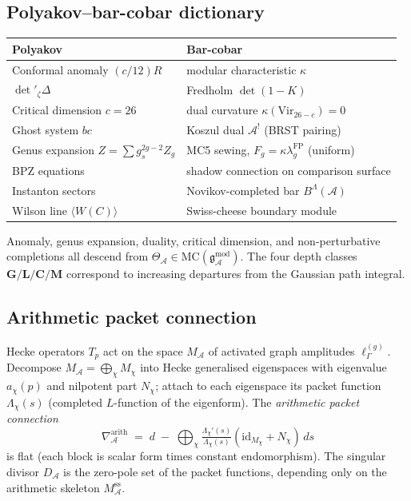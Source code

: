\documentclass[11pt]{report}
\theoremstyle{definition}
\theoremstyle{remark}
\providecommand{\cA}{\mathcal{A}}
\providecommand{\MC}{\mathrm{MC}}
\providecommand{\gAmod}{\mathfrak{g}^{\mathrm{mod}}_\cA}
\providecommand{\FP}{\mathrm{FP}}
\providecommand{\Vir}{\mathrm{Vir}}
\numberwithin{equation}{section}
\begin{document}
\subsection*{Polyakov--bar-cobar dictionary}

\begin{center}
\small
\renewcommand{\arraystretch}{1.1}
\begin{tabular}{ll}
\textbf{Polyakov} & \textbf{Bar-cobar}\\ \hline
Conformal anomaly $(c/12)R$ & modular characteristic $\kappa$\\
$\det'_\zeta \Delta$ & Fredholm $\det(1 - K)$\\
Critical dimension $c = 26$ & dual curvature $\kappa(\Vir_{26-c}) = 0$\\
Ghost system $bc$ & Koszul dual $\cA^!$ (BRST pairing)\\
Genus expansion $Z = \sum g_s^{2g-2}Z_g$
 & MC5 sewing, $F_g = \kappa\lambda_g^{\FP}$ (uniform)\\
BPZ equations & shadow connection on comparison surface\\
Instanton sectors & Novikov-completed bar $B^\Lambda(\cA)$\\
Wilson line $\langle W(C)\rangle$ & Swiss-cheese boundary module
\end{tabular}
\end{center}
Anomaly, genus expansion, duality, critical dimension, and
non-perturbative completions all descend from
$\Theta_\cA \in \MC(\gAmod)$. The four depth classes
$\mathbf G/\mathbf L/\mathbf C/\mathbf M$ correspond to
increasing departures from the Gaussian path integral.

\subsection*{Arithmetic packet connection}

Hecke operators $T_p$ act on the space $M_\cA$ of activated
graph amplitudes $\ell_\Gamma^{(g)}$. Decompose
$M_\cA = \bigoplus_\chi M_\chi$ into Hecke generalised
eigenspaces with eigenvalue $a_\chi(p)$ and nilpotent part
$N_\chi$; attach to each eigenspace its packet function
$\Lambda_\chi(s)$ (completed $L$-function of the eigenform).
The \emph{arithmetic packet connection}
\[
\nabla_\cA^{\mathrm{arith}}
\;=\;
d \;-\; \bigoplus_\chi
\tfrac{\Lambda_\chi'(s)}{\Lambda_\chi(s)}
(\mathrm{id}_{M_\chi} + N_\chi)\,ds
\]
is flat (each block is scalar form times constant endomorphism).
The singular divisor $D_\cA$ is the zero-pole set of the packet
functions, depending only on the arithmetic skeleton
$M_\cA^{\mathrm{ss}}$.
\end{document}
